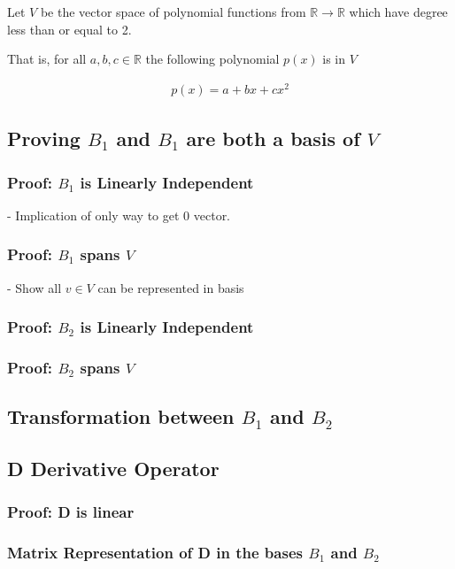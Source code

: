 \documentclass{article}
\begin{document}
    Let $V$ be the vector space of polynomial functions from $\mathbb{R} \rightarrow \mathbb{R}$ which have degree less than or equal to 2.

    That is, for all $a, b, c \in \mathbb{R}$ the following polynomial $p(x)$ is in $V$
    
    \begin{align*}
    p(x) = a + bx + cx^2
    \end{align*}    

    \subsection{Proving $B_1$ and $B_1$ are both a basis of $V$}

    \subsubsection{Proof: $B_1$ is Linearly Independent}
    - Implication of only way to get 0 vector.
    \subsubsection{Proof: $B_1$ spans $V$}
    - Show all $v \in V$ can be represented in basis

    \subsubsection{Proof: $B_2$ is Linearly Independent}

    \subsubsection{Proof: $B_2$ spans $V$}

    \subsection{Transformation between $B_1$ and $B_2$}

    \subsection{D Derivative Operator}

    \subsubsection{Proof: D is linear}

    \subsubsection{Matrix Representation of D in the bases $B_1$ and $B_2$}
\end{document}
